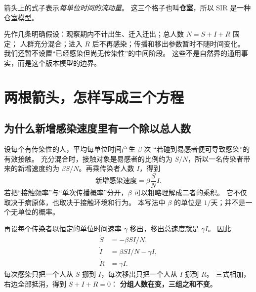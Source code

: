 \documentclass[UTF8,11pt,fontset=none]{ctexart}
\begin{document}
\begin{center}
\end{center}
箭头上的式子表示\emph{每单位时间的流动量}。
这三个格子也叫\textbf{仓室}，所以 SIR 是一种仓室模型。

先作几条明确假设：观察期内不计出生、迁入迁出；总人数 $N=S+I+R$ 固定；
人群充分混合；进入 $R$ 后不再感染；传播和移出参数暂时不随时间变化。
我们还暂不设置“已经感染但尚无传染性”的中间阶段。
这些不是自然界的通用事实，而是这个版本模型的边界。

\section{两根箭头，怎样写成三个方程}
\subsection{为什么新增感染速度里有一个除以总人数}
设每个有传染性的人，平均每单位时间产生 $\beta$ 次
“若碰到易感者便可导致感染”的有效接触。
充分混合时，接触对象是易感者的比例约为 $S/N$，所以一名传染者带来的新增速度约为
$\beta S/N$。再乘传染者人数 $I$，得到
\[
\text{新增感染速度}=\beta\frac SN I.
\]
若把“接触频率”与“单次传播概率”分开，$\beta$ 可以粗略理解成二者的乘积。
它不仅取决于病原体，也取决于接触环境和行为。
本写法中 $\beta$ 的单位是 $1/\text{天}$；并不是一个无单位的概率。

再设每个传染者以恒定的单位时间速率 $\gamma$ 移出，移出总速度就是 $\gamma I$。
因此
\begin{equation}\label{eq:sir}
\boxed{\begin{aligned}
\dot S&=-\beta SI/N,\\
\dot I&=\beta SI/N-\gamma I,\\
\dot R&=\gamma I.
\end{aligned}}
\end{equation}
每次感染只把一个人从 $S$ 挪到 $I$，每次移出只把一个人从 $I$ 挪到 $R$。
三式相加，右边全部抵消，得到 $\dot S+\dot I+\dot R=0$：
\textbf{分组人数在变，三组之和不变}。
\end{document}
